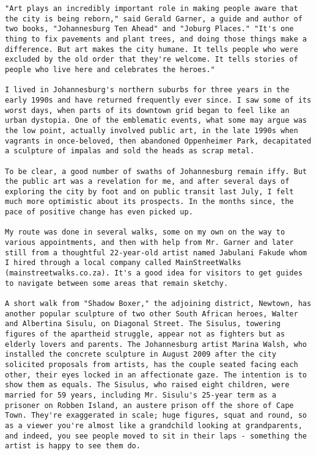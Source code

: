 \begin{lstlisting}
"Art plays an incredibly important role in making people aware that the city is being reborn," said Gerald Garner, a guide and author of two books, "Johannesburg Ten Ahead" and "Joburg Places." "It's one thing to fix pavements and plant trees, and doing those things make a difference. But art makes the city humane. It tells people who were excluded by the old order that they're welcome. It tells stories of people who live here and celebrates the heroes."

I lived in Johannesburg's northern suburbs for three years in the early 1990s and have returned frequently ever since. I saw some of its worst days, when parts of its downtown grid began to feel like an urban dystopia. One of the emblematic events, what some may argue was the low point, actually involved public art, in the late 1990s when vagrants in once-beloved, then abandoned Oppenheimer Park, decapitated a sculpture of impalas and sold the heads as scrap metal.

To be clear, a good number of swaths of Johannesburg remain iffy. But the public art was a revelation for me, and after several days of exploring the city by foot and on public transit last July, I felt much more optimistic about its prospects. In the months since, the pace of positive change has even picked up.

My route was done in several walks, some on my own on the way to various appointments, and then with help from Mr. Garner and later still from a thoughtful 22-year-old artist named Jabulani Fakude whom I hired through a local company called MainStreetWalks (mainstreetwalks.co.za). It's a good idea for visitors to get guides to navigate between some areas that remain sketchy.

A short walk from "Shadow Boxer," the adjoining district, Newtown, has another popular sculpture of two other South African heroes, Walter and Albertina Sisulu, on Diagonal Street. The Sisulus, towering figures of the apartheid struggle, appear not as fighters but as elderly lovers and parents. The Johannesburg artist Marina Walsh, who installed the concrete sculpture in August 2009 after the city solicited proposals from artists, has the couple seated facing each other, their eyes locked in an affectionate gaze. The intention is to show them as equals. The Sisulus, who raised eight children, were married for 59 years, including Mr. Sisulu's 25-year term as a prisoner on Robben Island, an austere prison off the shore of Cape Town. They're exaggerated in scale; huge figures, squat and round, so as a viewer you're almost like a grandchild looking at grandparents, and indeed, you see people moved to sit in their laps - something the artist is happy to see them do.


\end{lstlisting}
